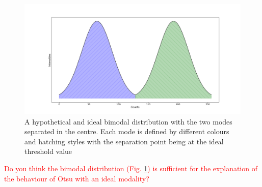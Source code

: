 \begin{figure}
    \centering
    \includegraphics[width=\textwidth]{figs/ch2figs/Bimodal.png}
    \caption[A hypothetical and ideal bimodal distribution with the two modes separated in the centre]{A hypothetical and ideal bimodal distribution with the two modes separated in the centre. Each mode is defined by different colours and hatching styles with the separation point being at the ideal threshold value}
    \label{fig:hypothetical_bimodal}
\end{figure}
\par\textcolor{red}{Do you think the bimodal distribution (Fig. \ref{fig:hypothetical_bimodal}) is sufficient for the explanation of the behaviour of Otsu with an ideal modality?}

